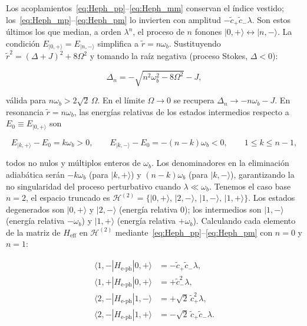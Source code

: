 Los acoplamientos~\eqref{eq:Heph_pp}--\eqref{eq:Heph_mm} conservan el índice vestido; los~\eqref{eq:Heph_mp}--\eqref{eq:Heph_pm} lo invierten con amplitud $-\tilde{c}_+\tilde{c}_-\lambda$. Son estos últimos los que median, a orden $\lambda^n$, el proceso de $n$ fonones $|0,{+}\rangle \leftrightarrow |n,{-}\rangle$. La condición $E_{|0,+\rangle} = E_{|n,-\rangle}$ simplifica a $\tilde{r} = n\omega_b$. Sustituyendo $\tilde{r}^2 = (\Delta+J)^2 + 8\Omega^2$ y tomando la raíz negativa (proceso Stokes, $\Delta < 0$):

\begin{equation}
	\Delta_n = -\sqrt{n^2\omega_b^2 - 8\Omega^2} - J,
	\label{eq:res_III}
\end{equation}

válida para $n\omega_b > 2\sqrt{2}\,\Omega$. En el límite $\Omega \to 0$ se recupera $\Delta_n \to -n\omega_b - J$. En resonancia $\tilde{r} = n\omega_b$, las energías relativas de los estados intermedios respecto a $E_0 \equiv E_{|0,+\rangle}$ son

\begin{equation}
	E_{|k,+\rangle} - E_0 = k\omega_b > 0,
	\qquad
	E_{|k,-\rangle} - E_0 = -(n-k)\omega_b < 0,
	\qquad 1 \leq k \leq n-1,
	\label{eq:energ_rel}
\end{equation}

todos no nulos y múltiplos enteros de $\omega_b$. Los denominadores en la eliminación adiabática serán $-k\omega_b$ (para $|k,+\rangle$) y $(n-k)\omega_b$ (para $|k,-\rangle$), garantizando la no singularidad del proceso perturbativo cuando $\lambda \ll \omega_b$. Tenemos el caso base $n=2$, el espacio truncado es $\mathcal{H}^{(2)} = \{|0,{+}\rangle,\allowbreak\,|2,{-}\rangle,\allowbreak\,|1,{-}\rangle,\allowbreak\,|1,{+}\rangle\}$. Los estados degenerados son $|0,+\rangle$ y $|2,-\rangle$ (energía relativa $0$); los intermedios son $|1,-\rangle$ (energía relativa $-\omega_b$) y $|1,+\rangle$ (energía relativa $+\omega_b$). Calculando cada elemento de la matriz de $H_\mathrm{eff}$ en $\mathcal{H}^{(2)}$ mediante~\eqref{eq:Heph_pp}--\eqref{eq:Heph_pm} con $n=0$ y $n=1$:

\begin{align}
	\langle 1,{-}|H_\mathrm{e\text{-}ph}|0,{+}\rangle
	&= -\tilde{c}_+\tilde{c}_-\lambda,
	\label{eq:h10mp}\\[2pt]
	\langle 1,{+}|H_\mathrm{e\text{-}ph}|0,{+}\rangle
	&= +\tilde{c}_-^2\lambda,
	\label{eq:h10pp}\\[2pt]
	\langle 2,{-}|H_\mathrm{e\text{-}ph}|1,{-}\rangle
	&= +\sqrt{2}\,\tilde{c}_+^2\lambda,
	\label{eq:h21mm}\\[2pt]
	\langle 2,{-}|H_\mathrm{e\text{-}ph}|1,{+}\rangle
	&= -\sqrt{2}\,\tilde{c}_+\tilde{c}_-\lambda.
	\label{eq:h21mp}
\end{align}


